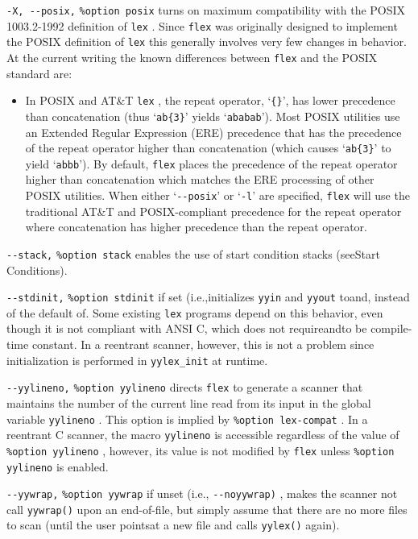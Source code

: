 \documentclass[openany,oneside]{book}
\begin{document}
\verb`-X, --posix,` \verb`%option posix` turns on maximum compatibility with the POSIX 1003.2-1992 definition of \verb`lex` .  Since \verb`flex` was originally designed to implement the
POSIX definition of \verb`lex` this generally involves very few changes
in behavior.  At the current writing the known differences between \verb`flex` and the POSIX standard are:
\begin{itemize}
\item In POSIX and AT\&{}T \verb`lex` , the repeat operator, ‘\verb`{}`’, has lower
precedence than concatenation (thus ‘\verb`ab{3}`’ yields ‘\verb`ababab`’). 
Most POSIX utilities use an Extended Regular Expression (ERE) precedence
that has the precedence of the repeat operator higher than concatenation
(which causes ‘\verb`ab{3}`’ to yield ‘\verb`abbb`’).  By default, \verb`flex` places the precedence of the repeat operator higher than concatenation
which matches the ERE processing of other POSIX utilities.  When either
‘\verb`--posix`’ or ‘\verb`-l`’ are specified, \verb`flex` will use the
traditional AT\&{}T and POSIX-compliant precedence for the repeat operator
where concatenation has higher precedence than the repeat operator.
\end{itemize}


\verb`--stack,` \verb`%option stack` enables the use of
start condition stacks (seeStart Conditions).

\verb`--stdinit,` \verb`%option stdinit` if set (i.e.,initializes \verb`yyin` and \verb`yyout` toand, instead of the default of.  Some existing \verb`lex` programs depend on this behavior,
even though it is not compliant with ANSI C, which does not requireandto be compile-time constant. In a
reentrant scanner, however, this is not a problem since initialization
is performed in \verb`yylex_init` at runtime.

\verb`--yylineno,` \verb`%option yylineno` directs \verb`flex` to generate a scanner
that maintains the number of the current line read from its input in the
global variable \verb`yylineno` .  This option is implied by \verb`%option lex-compat` .  In a reentrant C scanner, the macro \verb`yylineno` is
accessible regardless of the value of \verb`%option yylineno` , however, its
value is not modified by \verb`flex` unless \verb`%option yylineno` is enabled.

\verb`--yywrap,` \verb`%option yywrap` if unset (i.e., \verb`--noyywrap)` , makes the scanner not call \verb`yywrap()` upon an end-of-file, but simply assume that there are no
more files to scan (until the user pointsat a new file and
calls \verb`yylex()` again).
\end{document}
